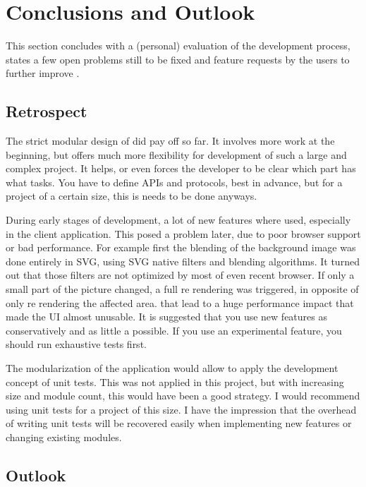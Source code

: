 \section{Conclusions and Outlook}
\label{sec:outlook}

This section concludes with a (personal) evaluation of the development process, states a few open problems still to be fixed and feature requests by the users to further improve \spl.

\subsection{Retrospect}

The strict modular design of \spl did pay off so far.
It involves more work at the beginning, but offers much more flexibility for development of such a large and complex project.
It helps, or even forces the developer to be clear which part has what tasks.
You have to define APIs and protocols, best in advance, but for a project of a certain size, this is needs to be done anyways.

During early stages of development, a lot of new features where used, especially in the client application.
This posed a problem later, due to poor browser support or bad performance.
For example first the blending of the background image was done entirely in SVG, using SVG native filters and blending algorithms.
It turned out that those filters are not optimized by most of even recent browser.
If only a small part of the picture changed, a full re rendering was triggered, in opposite of only re rendering the affected area. that lead to a huge performance impact that made the UI almost unusable.
It is suggested that you use new features as conservatively and as little a possible.
If you use an experimental feature, you should run exhaustive tests first.

The modularization of the application would allow to apply the development concept of unit tests.
This was not applied in this project, but with increasing size and module count, this would have been a good strategy.
I would recommend using unit tests for a project of this size.
I have the impression that the overhead of writing unit tests will be recovered easily when implementing new features or changing existing modules.


\subsection{Outlook}

